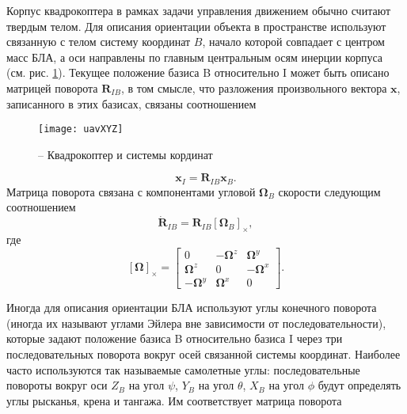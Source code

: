 Корпус квадрокоптера в рамках задачи управления движением обычно считают твердым телом. Для описания ориентации объекта в пространстве используют связанную с телом систему координат $B$, начало которой совпадает с центром масс БЛА, а оси направлены по главным центральным осям инерции корпуса (см. рис. \ref{fig:quad_scheme}). Текущее положение базиса B относительно I может быть описано матрицей поворота $\bm{R}_{IB}$, в том смысле, что разложения произвольного вектора $\bm{x}$, записанного в этих базисах, связаны соотношением
\begin{figure}[h!]
	\centering
	\texttt{[image: uavXYZ]}
	\caption{ -- Квадрокоптер и системы кординат}
	\label{fig:quad_scheme}
\end{figure}
\begin{equation} \label{eq:rotmx}
\bm{x}_I = \bm{R}_{IB}\bm{x}_B.
\end{equation}
Матрица поворота связана с компонентами угловой $\bm{\Omega}_B$ скорости следующим соотношением
\begin{equation} \label{eq:angvel_rotmx}
\dot{\bm{R}}_{IB} = \bm{R}_{IB} [\bm{\Omega}_B]_{\times},
\end{equation}
где
\begin{equation} \label{eq:hat_operator}
[\bm{\Omega}]_{\times} =
\begin{bmatrix}
0            & -\bm{\Omega}^z   & \bm{\Omega}^y \\
\bm{\Omega}^z     & 0           &-\bm{\Omega}^x\\
-\bm{\Omega}^y    & \bm{\Omega}^x    & 0
\end{bmatrix}.
\end{equation}

Иногда для описания ориентации БЛА используют углы конечного поворота (иногда их называют углами Эйлера вне зависимости от последовательности), которые задают положение базиса B относительно базиса I через три  последовательных поворота вокруг осей связанной системы координат. Наиболее часто используются так называемые самолетные углы: последовательные повороты вокруг оси $Z_B$ на угол $\psi$, $Y_B$ на угол $\theta$, $X_B$ на угол $\phi$ будут определять углы рысканья, крена и тангажа. Им соответствует матрица поворота

